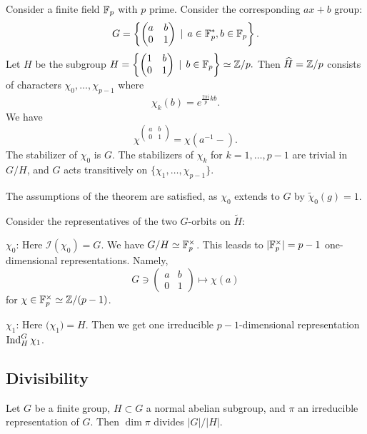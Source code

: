 \documentclass[11pt, english]{article}
\begin{document}
\begin{example}
 Consider a finite field $\mathbb{F}_p$ with $p$ prime. Consider the corresponding $ax+b$ group:
$$
G = \left\{ 
\begin{pmatrix}
a & b \\
0 & 1
\end{pmatrix} \, \mid \, a \in \mathbb{F}_p^\ast, b \in \mathbb{F}_p
\right\}.
$$
Let $H$ be the subgroup
$
H = \left\{ 
\begin{pmatrix}
1 & b \\
0 & 1
\end{pmatrix} \, \mid \,  b \in \mathbb{F}_p
\right\} \simeq \mathbb{Z}/p.
$
Then $\widehat H = \mathbb{Z}/p$ consists of characters $\chi_0,\ldots, \chi_{p-1}$ where
$$
\chi_k(b) = e^{\frac{2\pi i}{p} kb}.
$$
We have 
$$
\chi^{\begin{pmatrix} a & b \\ 0 & 1\end{pmatrix}} = \chi(a^{-1} -).
$$
The stabilizer of $\chi_0$ is $G$. The stabilizers of $\chi_k$ for $k=1,\ldots,p-1$ are trivial in $G/H$, and $G$ acts transitively on $\{ \chi_1,\ldots, \chi_{p-1} \}$. 

The assumptions of the theorem are satisfied, as $\chi_0$ extends to $G$ by $\widetilde \chi_0(g) = 1$.

Consider the representatives of the two $G$-orbits on $\widetilde H$:

\underline{$\chi_0$}: Here $\mathcal I(\chi_0)=G$. We have $G/H \simeq \mathbb{F}_p^\times$. This leasds to $\lvert \mathbb{F}_p^\times \rvert = p-1$ one-dimensional representations. Namely, 
$$
G \ni \begin{pmatrix} a & b \\ 0 & 1
\end{pmatrix} \mapsto \chi(a)
$$
for $\chi \in \mathbb{F}_p^\times\simeq \mathbb{Z}/(p-1)$. 

\underline{$\chi_1$}: Here $\mathcal(\chi_1)=H$. Then we get one irreducible $p-1$-dimensional representation $\operatorname{Ind}_H^G \chi_1$. 
\end{example}

\subsection{Divisibility}

\begin{thm}
  Let $G$ be a finite group, $H \subset G$ a normal abelian subgroup, and $\pi$ an irreducible representation of $G$. Then $\dim \pi$ divides $\lvert G \rvert / \lvert H \rvert$. 
\end{thm}
\end{document}
